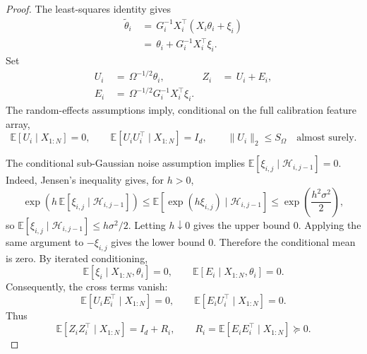 \documentclass{article} %
\begin{document}
\begin{proof}
The least-squares identity gives
\begin{equation}
\begin{aligned}
\widetilde\theta_i
&\,=\,
G_i^{-1}X_i^\top(X_i\theta_i+\xi_i)
\\
&\,=\,
\theta_i+G_i^{-1}X_i^\top\xi_i.
\end{aligned}
\end{equation}
Set
\begin{equation}
\begin{aligned}
U_i
&\,=\,
\Omega^{-1/2}\theta_i,
&
Z_i
&\,=\,
U_i+E_i,
\\
E_i
&\,=\,
\Omega^{-1/2}G_i^{-1}X_i^\top\xi_i.
\end{aligned}
\end{equation}
The random-effects assumptions imply, conditional on the full calibration
feature array,
\begin{equation}
\mathbb{E}[U_i\mid X_{1:N}]=0,
\qquad
\mathbb{E}[U_iU_i^\top\mid X_{1:N}]=I_d,
\qquad
\|U_i\|_2\leq S_\Omega
\quad\text{almost surely}.
\end{equation}

The conditional sub-Gaussian noise assumption implies
\(\mathbb{E}[\xi_{i,j}\mid\mathcal H_{i,j-1}]=0\). Indeed, Jensen's
inequality gives, for \(h>0\),
\begin{equation}
\exp\!\left(h\,\mathbb{E}[\xi_{i,j}\mid\mathcal{H}_{i,j-1}]\right)
\leq
\mathbb{E}\!\left[\exp(h\xi_{i,j})\mid\mathcal{H}_{i,j-1}\right]
\leq
\exp\!\left(\frac{h^2\sigma^2}{2}\right),
\end{equation}
so \(\mathbb{E}[\xi_{i,j}\mid\mathcal{H}_{i,j-1}]\le h\sigma^2/2\).  Letting
\(h\downarrow0\) gives the upper bound \(0\).  Applying the same argument to
\(-\xi_{i,j}\) gives the lower bound \(0\).  Therefore the conditional mean is
zero. By iterated conditioning,
\begin{equation}
\mathbb E[\xi_i\mid X_{1:N},\theta_i]=0,
\qquad
\mathbb E[E_i\mid X_{1:N},\theta_i]=0.
\end{equation}
Consequently, the cross terms vanish:
\begin{equation}
\mathbb{E}[U_iE_i^\top\mid X_{1:N}]=0,
\qquad
\mathbb{E}[E_iU_i^\top\mid X_{1:N}]=0.
\end{equation}
Thus
\begin{equation}
\mathbb{E}[Z_iZ_i^\top\mid X_{1:N}]
=
I_d+R_i,
\qquad
R_i=\mathbb{E}[E_iE_i^\top\mid X_{1:N}]\succeq0.
\end{equation}


\end{proof}
\end{document}
